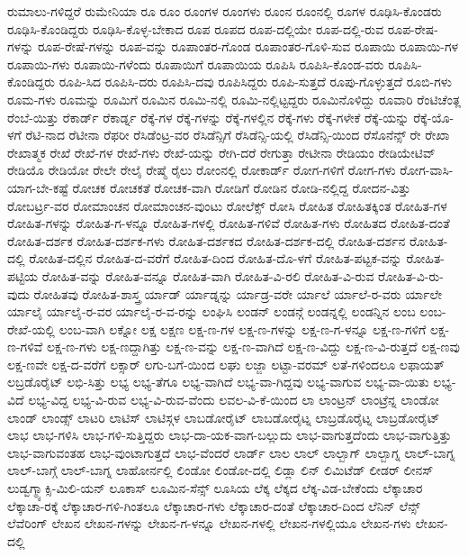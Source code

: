 {ರುಮಾಲು-ಗಳಿದ್ದರೆ
ರುಮೇನಿಯಾ
ರೂ
ರೂಂ
ರೂಂಗಳ
ರೂಂಗಳು
ರೂಂನ
ರೂಂನಲ್ಲಿ
ರೂಗಳ
ರೂಢಿಸಿ-ಕೊಂಡರು
ರೂಢಿಸಿ-ಕೊಂಡಿದ್ದರು
ರೂಢಿಸಿ-ಕೊಳ್ಳ-ಬೇಕಾದ
ರೂಪ
ರೂಪದ
ರೂಪ-ದಲ್ಲಿಯೇ
ರೂಪ-ದಲ್ಲಿ-ರುವ
ರೂಪ-ರೇಷ-ಗಳನ್ನು
ರೂಪ-ರೇಷೆ-ಗಳನ್ನು
ರೂಪ-ವನ್ನು
ರೂಪಾಂತರ-ಗೊಂಡ
ರೂಪಾಂತರ-ಗೊಳಿ-ಸುವ
ರೂಪಾಯಿ
ರೂಪಾಯಿ-ಗಳ
ರೂಪಾಯಿ-ಗಳು
ರೂಪಾಯಿ-ಗಳೆಂದು
ರೂಪಾಯಿಗೆ
ರೂಪಾಯಿಯ
ರೂಪಿಸಿ
ರೂಪಿಸಿ-ಕೊಂಡ-ವರು
ರೂಪಿಸಿ-ಕೊಂಡಿದ್ದರು
ರೂಪಿ-ಸಿದ
ರೂಪಿಸಿ-ದರು
ರೂಪಿಸಿ-ದವು
ರೂಪಿಸಿದ್ದರು
ರೂಪಿ-ಸುತ್ತದೆ
ರೂಪು-ಗೊಳ್ಳುತ್ತದೆ
ರೂಬಿ-ಗಳು
ರೂಮ-ಗಳು
ರೂಮನ್ನು
ರೂಮಿಗೆ
ರೂಮಿನ
ರೂಮಿ-ನಲ್ಲಿ
ರೂಮಿ-ನಲ್ಲಿಟ್ಟದ್ದರು
ರೂಮಿನೊಳಿದ್ದು
ರೂವಾರಿ
ರೆಂಟಿಚೆಂತ್ಲ
ರೆಂಬೆ-ಯಿತ್ತು
ರೆಕಾರ್ಡ್
ರೆಕಾರ್ಡ್ನ
ರೆಕ್ಕೆ-ಗಳ
ರೆಕ್ಕೆ-ಗಳನ್ನು
ರೆಕ್ಕೆ-ಗಳಲ್ಲಿನ
ರೆಕ್ಕೆ-ಗಳು
ರೆಕ್ಕೆ-ಗಳೇಕೆ
ರೆಕ್ಕೆ-ಯನ್ನು
ರೆಕ್ಕೆ-ಯೊ-ಳಗೆ
ರೆಟಿ-ನಾದ
ರೆಟೀನಾ
ರೆಫರೀ
ರೆಸಿಡೆಂಟ್ರ-ವರ
ರೆಸಿಡೆನ್ಸಿಗೆ
ರೆಸಿಡೆನ್ಸಿ-ಯಲ್ಲಿ
ರೆಸಿಡೆನ್ಸಿ-ಯಿಂದ
ರೆಸೊನೆನ್ಸ್
ರೇ
ರೇಖಾ
ರೇಖಾತ್ಮಕ
ರೇಖೆ
ರೇಖೆ-ಗಳ
ರೇಖೆ-ಗಳು
ರೇಖೆ-ಯನ್ನು
ರೇಗಿ-ದರೆ
ರೇಗುತ್ತಾ
ರೇಟೀನಾ
ರೇಡಿಯಂ
ರೇಡಿಯೇಟಿವ್
ರೇಡಿಯೊ
ರೇಡಿಯೋ
ರೇಲೇ
ರೇಲೈ
ರೇಷ್ಮೆ
ರೈಲು
ರೋಂನಲ್ಲಿ
ರೋಕಾರ್ಡ್
ರೋಗ-ಗಳಿಗೆ
ರೋಗ-ಗಳು
ರೋಗ-ವಾಸಿ-ಯಾಗ-ಬೇ-ಕಷ್ಟೆ
ರೋಚಕ
ರೋಚಕತೆ
ರೋಚಕ-ವಾಗಿ
ರೋಡಿಗೆ
ರೋಡಿನ
ರೋಡಿ-ನಲ್ಲಿದ್ದ
ರೋದನ-ವಿತ್ತು
ರೋಬರ್ಟ್ರ-ವರ
ರೋಮಾಂಚನ
ರೋಮಾಂಚನ-ವುಂಟು
ರೋಲೆಕ್ಸ್
ರೋಸಿ
ರೋಹಿತ
ರೋಹಿತಕ್ಕಿಂತ
ರೋಹಿತ-ಗಳ
ರೋಹಿತ-ಗಳನ್ನು
ರೋಹಿತ-ಗ-ಳನ್ನೂ
ರೋಹಿತ-ಗಳಲ್ಲಿ
ರೋಹಿತ-ಗಳಿವೆ
ರೋಹಿತ-ಗಳು
ರೋಹಿತದ
ರೋಹಿತ-ದಂತೆ
ರೋಹಿತ-ದರ್ಶಕ
ರೋಹಿತ-ದರ್ಶಕ-ಗಳು
ರೋಹಿತ-ದರ್ಶಕದ
ರೋಹಿತ-ದರ್ಶಕ-ದಲ್ಲಿ
ರೋಹಿತ-ದರ್ಶನ
ರೋಹಿತ-ದಲ್ಲಿ
ರೋಹಿತ-ದಲ್ಲಿನ
ರೋಹಿತ-ದ-ವರೆಗೆ
ರೋಹಿತ-ದಿಂದ
ರೋಹಿತ-ದೊ-ಳಗೆ
ರೋಹಿತ-ಪಟ್ಟಕ-ವನ್ನು
ರೋಹಿತ-ಪಟ್ಟಿಯ
ರೋಹಿತ-ವನ್ನು
ರೋಹಿತ-ವನ್ನೂ
ರೋಹಿತ-ವಾಗಿ
ರೋಹಿತ-ವಿ-ರಲಿ
ರೋಹಿತ-ವಿ-ರುವ
ರೋಹಿತ-ವಿ-ರು-ವುದು
ರೋಹಿತವು
ರೋಹಿತ-ಶಾಸ್ತ್ರ
ರ್ಯಾಡ್
ರ್ಯಾಡ್ನನ್ನು
ರ್ಯಾಡ್ರ-ವರೇ
ರ್ಯಾಲೆ
ರ್ಯಾಲೆ-ರ-ವರು
ರ್ಯಾಲೇ
ರ್ಯಾಲೈ
ರ್ಯಾಲೈ-ರ-ವರ
ರ್ಯಾಲೈ-ರ-ವ-ರನ್ನು
ಲಂಘಿಸಿ
ಲಂಡನ್
ಲಂಡನ್ಗೆ
ಲಂಡನ್ನಲ್ಲಿ
ಲಂಡನ್ನಿನ
ಲಂಬ
ಲಂಬ-ರೇಖೆ-ಯಲ್ಲಿ
ಲಂಬ-ವಾಗಿ
ಲಕ್ನೋ
ಲಕ್ಷ
ಲಕ್ಷಣ
ಲಕ್ಷ-ಣ-ಗಳ
ಲಕ್ಷ-ಣ-ಗಳನ್ನು
ಲಕ್ಷ-ಣ-ಗ-ಳನ್ನೂ
ಲಕ್ಷ-ಣ-ಗಳಿಗೆ
ಲಕ್ಷ-ಣ-ಗಳಿವೆ
ಲಕ್ಷ-ಣ-ಗಳು
ಲಕ್ಷ-ಣದ್ದಾಗಿತ್ತು
ಲಕ್ಷ-ಣ-ವನ್ನು
ಲಕ್ಷ-ಣ-ವಾಗಿದೆ
ಲಕ್ಷ-ಣ-ವಿದ್ದು
ಲಕ್ಷ-ಣ-ವಿ-ರುತ್ತದೆ
ಲಕ್ಷ-ಣವು
ಲಕ್ಷ-ಣವೇ
ಲಕ್ಷ-ದ-ವರೆಗೆ
ಲಕ್ಸಾರ್
ಲಗು-ಬಗೆ-ಯಿಂದ
ಲಘು
ಲಜ್ಜಾ
ಲಟ್ಟಾ-ವರಮ್
ಲತೆ-ಗಳಿಂದಲೂ
ಲಫಾಯತ್
ಲಬ್ರಡೊರೈಟ್
ಲಭಿ-ಸಿತ್ತು
ಲಭ್ಯ
ಲಭ್ಯ-ತೆಗೂ
ಲಭ್ಯ-ವಾಗಿದೆ
ಲಭ್ಯ-ವಾ-ಗಿದ್ದವು
ಲಭ್ಯ-ವಾಗುವ
ಲಭ್ಯ-ವಾ-ಯಿತು
ಲಭ್ಯ-ವಿದೆ
ಲಭ್ಯ-ವಿದ್ದ
ಲಭ್ಯ-ವಿ-ರುವ
ಲಭ್ಯ-ವಿ-ರುವ-ವೆಂದು
ಲವಲ-ವಿ-ಕೆ-ಯಿಂದ
ಲಾ
ಲಾಂಟ್ರನ್
ಲಾಂಟ್ರೆನ್ನ
ಲಾಂಡೋ
ಲಾಂಡ್
ಲಾಂಡ್ಸ್
ಲಾಟರಿ
ಲಾಟಿಸ್
ಲಾಟಿಸ್ಗಳ
ಲಾಬಡೋರೈಟ್
ಲಾಬಡೋರೈಟ್ನ
ಲಾಬ್ರಡೊರೈಟ್ನ
ಲಾಬ್ರಡೋರೈಟ್
ಲಾಭ
ಲಾಭ-ಗಳಿಸಿ
ಲಾಭ-ಗಳಿ-ಸುತ್ತಿದ್ದರು
ಲಾಭ-ದಾ-ಯಕ-ವಾಗ-ಬಲ್ಲುದು
ಲಾಭ-ವಾಗುತ್ತದೆಂದು
ಲಾಭ-ವಾಗುತ್ತಿತ್ತು
ಲಾಭ-ವಾಗುವಂತಹ
ಲಾಭ-ವುಂಟಾಗುತ್ತದೆ
ಲಾಭ-ವೆಂದರೆ
ಲಾರ್ಡ್
ಲಾಲ
ಲಾಲ್
ಲಾಲ್ಬಾಗ್
ಲಾಲ್ಬಾಗ್ನ
ಲಾಲ್-ಬಾಗ್ನ
ಲಾಲ್-ಬಾಗ್ಗೆ
ಲಾಲ್-ಬಾಗ್ನ
ಲಾಹೋರ್ನಲ್ಲಿ
ಲಿಂಡೋ
ಲಿಂಡೋ-ದಲ್ಲಿ
ಲಿಡ್ಲಾ
ಲಿನ್
ಲಿಮಿಟೆಡ್
ಲೀಡರ್
ಲೀನಸ್
ಲುಡ್ವಗ್ಮ್ಯಾಕ್ಸಿ-ಮಿಲಿ-ಯನ್
ಲೂಕಾಸ್
ಲೂಮಿನ-ಸೆನ್ಸ್
ಲೂಸಿಯ
ಲೆಕ್ಕ
ಲೆಕ್ಕದ
ಲೆಕ್ಕ-ವಿಡ-ಬೇಕೆಂದು
ಲೆಕ್ಕಾಚಾರ
ಲೆಕ್ಕಾಚಾ-ರಕ್ಕೆ
ಲೆಕ್ಕಾಚಾರ-ಗಳಿ-ಗಿಂತಲೂ
ಲೆಕ್ಕಾಚಾರ-ಗಳು
ಲೆಕ್ಕಾಚಾರ-ದಂತೆ
ಲೆಕ್ಕಾಚಾರ-ದಿಂದ
ಲೆನಿನ್
ಲೆನ್ಸ್
ಲೆವೆರಿಂಗ್
ಲೇಖನ
ಲೇಖನ-ಗಳನ್ನು
ಲೇಖನ-ಗ-ಳನ್ನೂ
ಲೇಖನ-ಗಳಲ್ಲಿ
ಲೇಖನ-ಗಳಲ್ಲಿಯೂ
ಲೇಖನ-ಗಳು
ಲೇಖನ-ದಲ್ಲಿ
}
